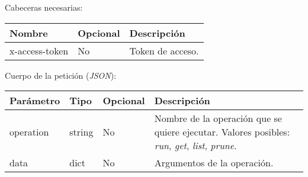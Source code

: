 		Cabeceras necesarias:
		\begin{table}[h!]
			\centering
	\begin{adjustbox}{max width=\textwidth}
			\begin{tabular}{|l|l|l|}
				\hline
				Nombre & Opcional & Descripción \\ \hline
				x-access-token & No & Token de acceso. \\ \hline
			\end{tabular}
\end{adjustbox}
		\end{table}
		
		Cuerpo de la petición (\textit{JSON}):
		\begin{table}[h!]
			\centering
	\begin{adjustbox}{max width=\textwidth}
			\begin{tabularx}{\linewidth}{|l|l|l|L|}
				\hline
				Parámetro & Tipo & Opcional & Descripción \\ \hline
				operation & string & No & Nombre de la operación que se quiere ejecutar. Valores posibles: \textit{run}, \textit{get}, \textit{list}, \textit{prune}. \\ \hline
				data & dict & No & Argumentos de la operación. \\ \hline
			\end{tabularx}
\end{adjustbox}
		\end{table}
	
		\pagebreak
